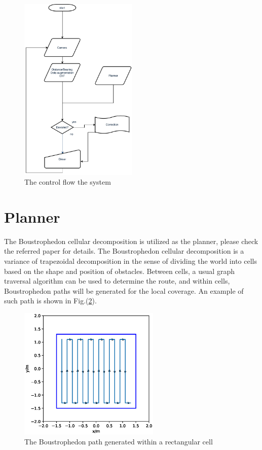 \documentclass[12pt]{article}
\begin{document}
\begin{figure}[htbp]
\centering
\includegraphics[width=0.5\textwidth]{../figs/cf.pdf}
\caption{The control flow the system}\label{cf}
\end{figure}

\section{Planner}
\label{plan}
The Boustrophedon cellular decomposition is utilized as the planner, please check the referred paper for details. The Boustrophedon cellular decomposition is a variance of trapezoidal decomposition in the sense of dividing the world into cells based on the shape and position of obstacles. Between cells, a usual graph traversal algorithm can be used to determine the route, and within cells, Boustrophedon paths will be generated for the local coverage. An example of such path is shown in Fig.(\ref{bp}).
\begin{figure}[htbp]
\centering
\includegraphics[width=0.6\textwidth]{../figs/bp.eps}
\caption{The Boustrophedon path generated within a rectangular cell}\label{bp}
\end{figure}
\end{document}

